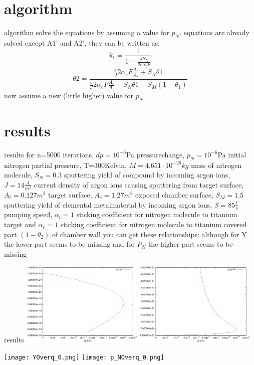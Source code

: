 \documentclass{beamer}
\begin{document}
\section{algorithm}
\begin{frame}{algorithm}
	solve the equations by assuming a value for $p_{N}$. equations are already solved except A1' and A2', they can be written as:
	\begin{equation} \theta_{1}=\frac{1}{1+\frac{JS_{N}}{2e\alpha_{t}F}}  \end{equation}
		\begin{equation} \theta{2}=\frac{\frac{e}{J}2\alpha_{c}F\frac{A_{c}}{A_{t}}+S_N\theta{1}}{\frac{e}{J}2\alpha_{c}F\frac{A_{c}}{A_{t}}+S_N\theta{1}+S_{M}(1-\theta_{1})}  \end{equation}
			now assume a new (little higher) value for $p_{N}$
\end{frame}
\section{results}
\begin{frame}{results}
	for n=5000 iterations, $dp=10^{-6}$Pa pressurechange, $p_N=10^{-6}$Pa initial nitrogen partial pressure, T=300Kelvin, $M=4.651\cdot10^{-26}kg$ mass of nitrogen molecule, $S_{N}=0.3$ sputtering yield of compound by incoming argon ions, $J=14\frac{A}{m^{2}}$ current density of argon ions causing sputtering from target surface, $A_{t}=0.127m^{2}$ target surface, $A_{c}=1.27m^{2}$ exposed chamber surface, $S_{M}=1.5$ sputtering yield of elemental metalmaterial by incoming argon ions, $S=85\frac{l}{s}$ pumping speed, $\alpha_{t}=1$ sticking coefficient for nitrogen molecule to titanium target and $\alpha_{c}=1$ sticking coefficient for nitrogen molecule to titanium covered part $(1-\theta_{2})$ of chamber wall you can get these relationships: although for Y the lower part seems to be missing and for $P_N$ the higher part seems to be missing
\end{frame}
\begin{frame}{results}
	\includegraphics[width=2.3in]{YOverq_0.ps}
	\includegraphics[width=2.3in]{p_NOverq_0.ps}

	\texttt{[image: YOverq\_0.png]}
	\texttt{[image: p\_NOverq\_0.png]}

\end{frame}
\end{document}
